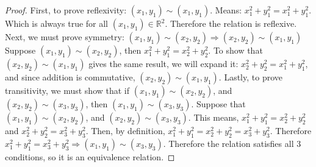 \documentclass[12pt]{article}
\newcommand{\R}{\mathbb{R}}
\begin{document}
\begin{enumerate}
\begin{proof}
    First, to prove reflexivity: $(x_{1},y_{1})\sim(x_{1},y_{1})$. Means: $x_{1}^{2}+y_{1}^{2}=x_{1}^{2}+y_{1}^{2}$. Which is always true for all $(x_{1},y_{1})\in\R^{2}$. Therefore the relation is reflexive. Next, we must prove symmetry: $(x_{1},y_{1})\sim(x_{2}, y_{2})\Longrightarrow(x_{2},y_{2})\sim(x_{1}, y_{1})$ Suppose $(x_{1},y_{1})\sim(x_{2}, y_{2})$, then $x_{1}^{2}+y_{1}^{2}=x_{2}^{2}+y_{2}^{2}$. To show that $(x_{2},y_{2})\sim(x_{1}, y_{1})$ gives the same result, we will expand it: $x_{2}^{2}+y_{2}^{2}=x_{1}^{2}+y_{1}^{2}$, and since addition is commutative, $(x_{2},y_{2})\sim(x_{1}, y_{1})$. Lastly, to prove transitivity, we must show that if $(x_{1},y_{1})\sim(x_{2},y_{2})$, and $(x_{2},y_{2})\sim(x_{3},y_{3})$, then $(x_{1},y_{1})\sim(x_{3},y_{3})$. Suppose that $(x_{1},y_{1})\sim(x_{2},y_{2})$, and $(x_{2},y_{2})\sim(x_{3},y_{3})$. This means, $x_{1}^{2}+y_{1}^{2}=x_{2}^{2}+y_{2}^{2}$ and \newline $x_{2}^{2}+y_{2}^{2}=x_{3}^{2}+y_{3}^{2}$. Then, by definition, $x_{1}^{2}+y_{1}^{2}=x_{2}^{2}+y_{2}^{2}=x_{3}^{2}+y_{3}^{2}$. Therefore $x_{1}^{2}+y_{1}^{2}=x_{3}^{2}+y_{3}^{2}\Longrightarrow(x_{1},y_{1})\sim(x_{3},y_{3})$. Therefore the relation satisfies all 3 conditions, so it is an equivalence relation.
    \end{proof}
\end{enumerate}
\end{document}
